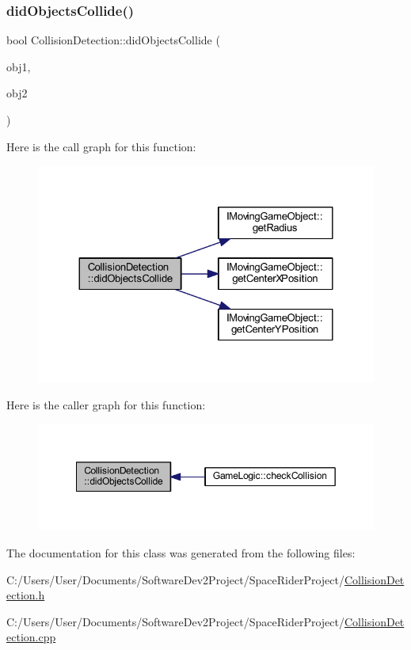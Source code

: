 \subsubsection{\texorpdfstring{did\+Objects\+Collide()}{didObjectsCollide()}}
{\footnotesize\ttfamily bool Collision\+Detection\+::did\+Objects\+Collide (\begin{DoxyParamCaption}\item[{\hyperlink{class_i_moving_game_object}{I\+Moving\+Game\+Object} \&}]{obj1,  }\item[{\hyperlink{class_i_moving_game_object}{I\+Moving\+Game\+Object} \&}]{obj2 }\end{DoxyParamCaption})}

Here is the call graph for this function\+:\nopagebreak
\begin{figure}[H]
\begin{center}
\leavevmode
\includegraphics[width=324pt]{class_collision_detection_a8e58e83acc7de60673126754ac2246cd_cgraph}
\end{center}
\end{figure}
Here is the caller graph for this function\+:
\nopagebreak
\begin{figure}[H]
\begin{center}
\leavevmode
\includegraphics[width=349pt]{class_collision_detection_a8e58e83acc7de60673126754ac2246cd_icgraph}
\end{center}
\end{figure}


The documentation for this class was generated from the following files\+:\begin{DoxyCompactItemize}
\item 
C\+:/\+Users/\+User/\+Documents/\+Software\+Dev2\+Project/\+Space\+Rider\+Project/\hyperlink{_collision_detection_8h}{Collision\+Detection.\+h}\item 
C\+:/\+Users/\+User/\+Documents/\+Software\+Dev2\+Project/\+Space\+Rider\+Project/\hyperlink{_collision_detection_8cpp}{Collision\+Detection.\+cpp}\end{DoxyCompactItemize}

